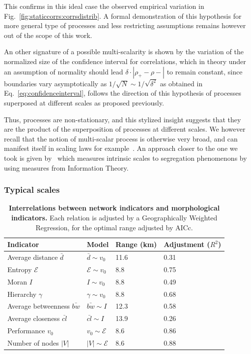 \documentclass[11pt]{article}
\begin{document}
This confirms in this ideal case the observed empirical variation in Fig.~\ref{fig:staticcorrs:corrsdistrib}. A formal demonstration of this hypothesis for more general type of processes and less restricting assumptions remains however out of the scope of this work.


An other signature of a possible multi-scalarity is shown by the variation of the normalized size of the confidence interval for correlations, which in theory under an assumption of normality should lead $\delta\cdot \left|\rho_+ - \rho -\right|$ to remain constant, since boundaries vary asymptotically as $1/\sqrt{N}\sim 1/\sqrt{\delta^2}$ as obtained in Eq.~\ref{eq:confidenceinterval}, follows the direction of this hypothesis of processes superposed at different scales as proposed previously.


Thus, processes are non-stationary, and this stylized insight suggests that they are the product of the superposition of processes at different scales. We however recall that the notion of multi-scalar process is otherwise very broad, and can manifest itself in scaling laws for example~\citep{west2017scale}. An approach closer to the one we took is given by~\cite{Chodrow31102017} which measures intrinsic scales to segregation phenomenons by using measures from Information Theory.





\subsubsection{Typical scales}

\begin{table}[h!]
\caption{\textbf{Interrelations between network indicators and morphological indicators.} Each relation is adjusted by a Geographically Weighted Regression, for the optimal range adjusted by AICc.\label{tab:staticcorrelations:gwr}}
\begin{center}
\begin{tabular}{|l|l|l|l|}
\hline
Indicator & Model & Range (km) & Adjustment ($R^2$) \\ \hline
Average distance $\bar{d}$ & $\bar{d} \sim v_0$ & 11.6 & 0.31 \\
Entropy $\mathcal{E}$  & $\mathcal{E} \sim v_0$ &  8.8  &0.75 \\
Moran $I$ & $I \sim v_0$ & 8.8 & 0.49 \\
Hierarchy $\gamma$ & $\gamma \sim v_0$ & 8.8  & 0.68 \\\hline
Average betweenness $\bar{bw}$ & $\bar{bw} \sim I$ & 12.3 & 0.58 \\
Average closeness $\bar{cl}$ & $\bar{cl}\sim I$ & 13.9 & 0.26 \\
Performance $v_0$ & $v_0 \sim \mathcal{E}$ & 8.6  & 0.86 \\
Number of nodes $\left|V\right|$ & $\left|V\right| \sim \mathcal{E}$ & 8.6  & 0.88 \\\hline
\end{tabular}
\end{center}
\end{table}
\end{document}
